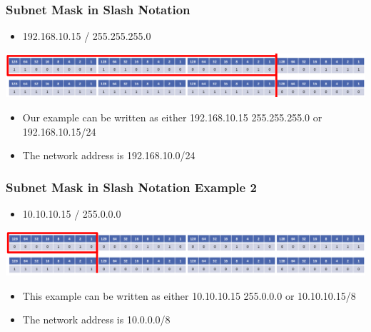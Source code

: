 \documentclass[pdflatex,compress]{beamer}
\begin{document}
\begin{frame}
	\frametitle{Subnet Mask in Slash Notation}
	\begin{itemize}
		\item 192.168.10.15 / 255.255.255.0
	\end{itemize}
	\begin{center}
		\includegraphics[width=\linewidth]{img/img36}
	\end{center}
	\begin{itemize}
		\item Our example can be written as either 192.168.10.15 255.255.255.0 or 192.168.10.15/24
		\item The network address is 192.168.10.0/24
	\end{itemize}
\end{frame}

\begin{frame}
	\frametitle{Subnet Mask in Slash Notation Example 2}
	\begin{itemize}
		\item 10.10.10.15 / 255.0.0.0
	\end{itemize}
	\begin{center}
		\includegraphics[width=\linewidth]{img/img37}
	\end{center}
	\begin{itemize}
		\item This example can be written as either 10.10.10.15 255.0.0.0 or 10.10.10.15/8
		\item The network address is 10.0.0.0/8
	\end{itemize}
\end{frame}
\end{document}
